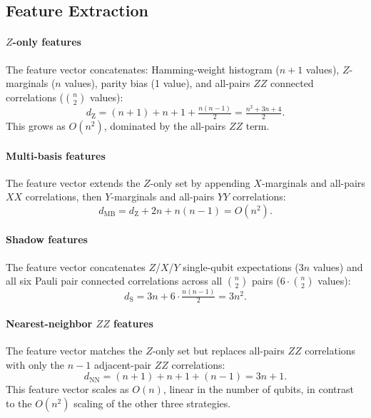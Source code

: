 \documentclass[conference]{IEEEtran}
\newcommand{\nqubits}{n}
\begin{document}
\subsection{Feature Extraction}
\label{sec:features}

\paragraph{$Z$-only features}
The feature vector concatenates: Hamming-weight histogram ($\nqubits+1$ values), $Z$-marginals ($\nqubits$ values), parity bias (1 value), and all-pairs $ZZ$ connected correlations ($\binom{\nqubits}{2}$ values):
\begin{equation}
d_{\text{Z}} = (\nqubits+1) + \nqubits + 1 + \tfrac{\nqubits(\nqubits-1)}{2} = \tfrac{\nqubits^2 + 3\nqubits + 4}{2}.
\end{equation}
This grows as $O(\nqubits^2)$, dominated by the all-pairs $ZZ$ term.

\paragraph{Multi-basis features}
The feature vector extends the $Z$-only set by appending $X$-marginals and all-pairs $XX$ correlations, then $Y$-marginals and all-pairs $YY$ correlations:
\begin{equation}
d_{\text{MB}} = d_{\text{Z}} + 2\nqubits + \nqubits(\nqubits-1) = O(\nqubits^2).
\end{equation}

\paragraph{Shadow features}
The feature vector concatenates $Z$/$X$/$Y$ single-qubit expectations ($3\nqubits$ values) and all six Pauli pair connected correlations across all $\binom{\nqubits}{2}$ pairs ($6 \cdot \binom{\nqubits}{2}$ values):
\begin{equation}
d_{\text{S}} = 3\nqubits + 6 \cdot \tfrac{\nqubits(\nqubits-1)}{2} = 3\nqubits^2.
\end{equation}

\paragraph{Nearest-neighbor $ZZ$ features}
The feature vector matches the $Z$-only set but replaces all-pairs $ZZ$ correlations with only the $\nqubits - 1$ adjacent-pair $ZZ$ correlations:
\begin{equation}
d_{\text{NN}} = (\nqubits+1) + \nqubits + 1 + (\nqubits - 1) = 3\nqubits + 1.
\end{equation}
This feature vector scales as $O(\nqubits)$, linear in the number of qubits, in contrast to the $O(\nqubits^2)$ scaling of the other three strategies.
\end{document}
